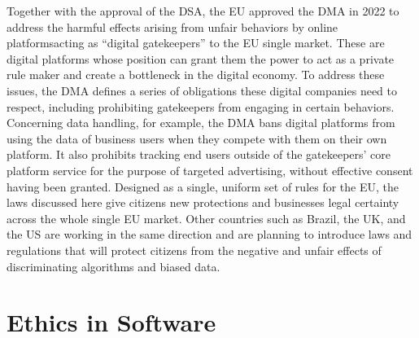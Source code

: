 Together with the approval of the DSA, the EU approved the DMA in 2022 to address the harmful effects arising from unfair behaviors by online platforms\break acting as ``digital gatekeepers'' to the EU single market. These are digital platforms whose position can grant them the power to act as a private rule maker and create a bottleneck in the digital economy. To address these issues, the DMA defines a series of obligations these digital companies need to respect, including prohibiting gatekeepers from engaging in certain behaviors. Concerning data handling, for example, the DMA bans digital platforms from using the data of business users when they compete with them on their own platform. It also prohibits tracking end users outside of the gatekeepers' core platform service for the purpose of targeted advertising, without effective consent having been granted. Designed as a single, uniform set of rules for the EU, the laws discussed here give citizens new protections and businesses legal certainty across the whole single EU market. Other countries such as Brazil, the UK, and the US are working in the same direction and are planning to introduce laws and regulations that will protect citizens from the negative and unfair effects of discriminating algorithms and biased data.

\section{\label{sec:7.6}Ethics in Software}

